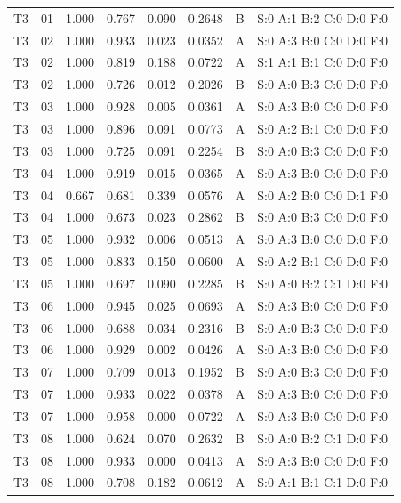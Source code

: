 \begin{longtable}{lrrrrrll}
T3 & 01 & 1.000 & 0.767 & 0.090 & 0.2648 & B & \tiny S:0 A:1 B:2 C:0 D:0 F:0 \\
T3 & 02 & 1.000 & 0.933 & 0.023 & 0.0352 & A & \tiny S:0 A:3 B:0 C:0 D:0 F:0 \\
T3 & 02 & 1.000 & 0.819 & 0.188 & 0.0722 & A & \tiny S:1 A:1 B:1 C:0 D:0 F:0 \\
T3 & 02 & 1.000 & 0.726 & 0.012 & 0.2026 & B & \tiny S:0 A:0 B:3 C:0 D:0 F:0 \\
T3 & 03 & 1.000 & 0.928 & 0.005 & 0.0361 & A & \tiny S:0 A:3 B:0 C:0 D:0 F:0 \\
T3 & 03 & 1.000 & 0.896 & 0.091 & 0.0773 & A & \tiny S:0 A:2 B:1 C:0 D:0 F:0 \\
T3 & 03 & 1.000 & 0.725 & 0.091 & 0.2254 & B & \tiny S:0 A:0 B:3 C:0 D:0 F:0 \\
T3 & 04 & 1.000 & 0.919 & 0.015 & 0.0365 & A & \tiny S:0 A:3 B:0 C:0 D:0 F:0 \\
T3 & 04 & 0.667 & 0.681 & 0.339 & 0.0576 & A & \tiny S:0 A:2 B:0 C:0 D:1 F:0 \\
T3 & 04 & 1.000 & 0.673 & 0.023 & 0.2862 & B & \tiny S:0 A:0 B:3 C:0 D:0 F:0 \\
T3 & 05 & 1.000 & 0.932 & 0.006 & 0.0513 & A & \tiny S:0 A:3 B:0 C:0 D:0 F:0 \\
T3 & 05 & 1.000 & 0.833 & 0.150 & 0.0600 & A & \tiny S:0 A:2 B:1 C:0 D:0 F:0 \\
T3 & 05 & 1.000 & 0.697 & 0.090 & 0.2285 & B & \tiny S:0 A:0 B:2 C:1 D:0 F:0 \\
T3 & 06 & 1.000 & 0.945 & 0.025 & 0.0693 & A & \tiny S:0 A:3 B:0 C:0 D:0 F:0 \\
T3 & 06 & 1.000 & 0.688 & 0.034 & 0.2316 & B & \tiny S:0 A:0 B:3 C:0 D:0 F:0 \\
T3 & 06 & 1.000 & 0.929 & 0.002 & 0.0426 & A & \tiny S:0 A:3 B:0 C:0 D:0 F:0 \\
T3 & 07 & 1.000 & 0.709 & 0.013 & 0.1952 & B & \tiny S:0 A:0 B:3 C:0 D:0 F:0 \\
T3 & 07 & 1.000 & 0.933 & 0.022 & 0.0378 & A & \tiny S:0 A:3 B:0 C:0 D:0 F:0 \\
T3 & 07 & 1.000 & 0.958 & 0.000 & 0.0722 & A & \tiny S:0 A:3 B:0 C:0 D:0 F:0 \\
T3 & 08 & 1.000 & 0.624 & 0.070 & 0.2632 & B & \tiny S:0 A:0 B:2 C:1 D:0 F:0 \\
T3 & 08 & 1.000 & 0.933 & 0.000 & 0.0413 & A & \tiny S:0 A:3 B:0 C:0 D:0 F:0 \\
T3 & 08 & 1.000 & 0.708 & 0.182 & 0.0612 & A & \tiny S:0 A:1 B:1 C:1 D:0 F:0 \\

\end{longtable}
